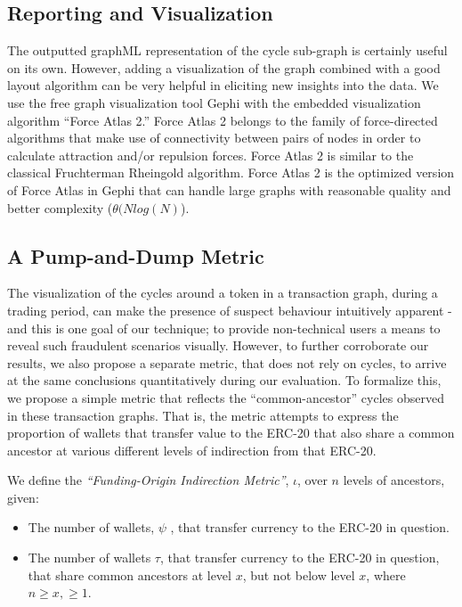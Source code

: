 \documentclass[conference]{IEEEtran}
\begin{document}
\subsection{Reporting and Visualization}\label{visualisation}
The outputted graphML representation of the cycle sub-graph is certainly useful on its own. However, adding a visualization of the graph combined with a good layout algorithm can be very helpful in eliciting new insights into the data.  We use the free graph visualization tool Gephi\cite{bastian2009gephi} with the embedded visualization algorithm ``Force Atlas 2.'' Force Atlas 2 belongs to the family of force-directed algorithms that make use of connectivity between pairs of nodes in order to calculate attraction and/or repulsion forces. Force Atlas 2 is similar to the classical Fruchterman Rheingold \cite{Fruchterman:1991:GDF:137556.137557} algorithm. Force Atlas 2 is the optimized version of Force Atlas in Gephi that can handle large graphs with reasonable quality and better complexity ($\theta(Nlog(N)$)\cite{barnes}.


\subsection{A Pump-and-Dump Metric}
The visualization of the cycles around a token in a transaction graph, during a trading period, can make the presence of suspect behaviour intuitively apparent - and this is one goal of our technique; to provide non-technical users a means to reveal such fraudulent scenarios visually. However, to further corroborate our results, we also propose a separate metric, that does not rely on cycles, to arrive at the same conclusions quantitatively during our evaluation. To formalize this, we propose a simple metric that reflects the ``common-ancestor'' cycles observed in these transaction graphs. That is, the metric attempts to express the proportion of wallets that transfer value to the ERC-20 that also share a common ancestor at various different levels of indirection from that ERC-20.

We define the \emph{``Funding-Origin Indirection Metric''}, $\iota$, over $n$ levels of ancestors, given:

\begin{itemize}
    \item The number of wallets, $\psi$ , that transfer currency to the ERC-20 in question.
    \item The number of wallets $\tau$, that transfer currency to the ERC-20 in question, that share common ancestors at level $x$, but not below level $x$, where $n \geqslant x, \geqslant 1$.
\end{itemize}
\end{document}
